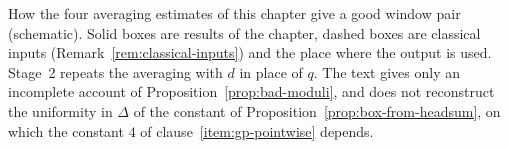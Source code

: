 \ifdim\wd0>\linewidth\resizebox{\linewidth}{!}{\box0}%
\else\leavevmode\box0\fi
\caption{How the four averaging estimates of this chapter give a good
window pair (schematic). Solid boxes are results of the chapter,
dashed boxes are classical inputs (Remark~\ref{rem:classical-inputs})
and the place where the output is used. Stage~2 repeats the averaging
with $d$ in place of $q$. The text gives only an incomplete account of
Proposition~\ref{prop:bad-moduli}, and does not reconstruct the
uniformity in $\Delta$ of the constant of
Proposition~\ref{prop:box-from-headsum}, on which the constant $4$ of
clause~\ref{item:gp-pointwise} depends.}
\label{fig:averaging-flow}
